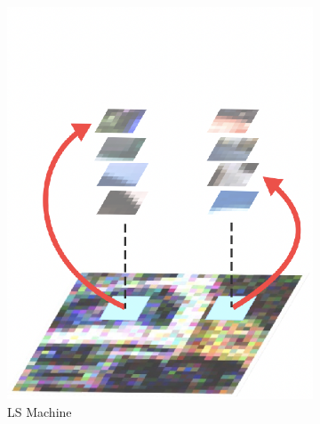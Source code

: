 \documentclass{article}
\theoremstyle{plain}
\theoremstyle{definition}
\theoremstyle{remark}
\begin{document}
\begin{figure}[t]
\begin{subfigure}[t]{0.2875\linewidth}
\includegraphics[width=\linewidth]{LS1.png}
\caption{LS Machine}
\label{fig:els-machine-structureb}
\end{subfigure} %
\begin{subfigure}[t]{0.2875\linewidth}
\captionsetup{justification=centering,singlelinecheck=off}

\end{subfigure}
\end{figure}
\end{document}

